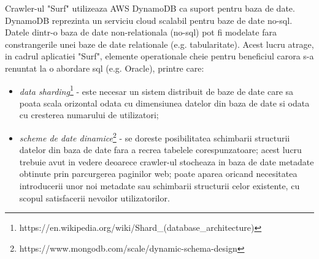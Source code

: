 \noindent
Crawler-ul "Surf" utilizeaza AWS DynamoDB ca suport pentru baza de date. DynamoDB reprezinta un serviciu cloud scalabil pentru baze de date no-sql. Datele dintr-o baza de date non-relationala (no-sql) pot fi modelate fara constrangerile unei baze de date relationale (e.g. tabularitate). Acest lucru atrage, in cadrul aplicatiei "Surf", elemente operationale cheie pentru beneficiul carora s-a renuntat la o abordare sql (e.g. Oracle), printre care:


\begin{itemize}

	\item{\emph{data sharding}\footnote{https://en.wikipedia.org/wiki/Shard\_(database\_architecture)} - este necesar un sistem distribuit de baze de date care sa poata scala orizontal odata cu dimensiunea datelor din baza de date si odata cu cresterea numarului de utilizatori;}
	\item{\emph{scheme de date dinamice}\footnote{https://www.mongodb.com/scale/dynamic-schema-design} - se doreste posibilitatea schimbarii structurii datelor din baza de date fara a recrea tabelele corespunzatoare; acest lucru trebuie avut in vedere deoarece crawler-ul stocheaza in baza de date metadate obtinute prin parcurgerea paginilor web; poate aparea oricand necesitatea introducerii unor noi metadate sau schimbarii structurii celor existente, cu scopul satisfacerii nevoilor utilizatorilor.}
	
\end{itemize}

